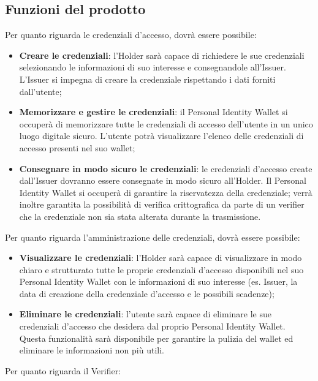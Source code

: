 \subsection{Funzioni del prodotto}
Per quanto riguarda le credenziali d’accesso, dovrà essere possibile: 
\begin{itemize}
    \item \textbf{Creare le credenziali}: l’Holder sarà capace di richiedere le sue credenziali selezionando le informazioni di suo interesse e consegnandole all’Issuer. L’Issuer si impegna di creare la credenziale rispettando i dati forniti dall’utente;
    \item \textbf{Memorizzare e gestire le credenziali}: il Personal Identity Wallet si occuperà di memorizzare tutte le credenziali di accesso dell’utente in un unico luogo digitale sicuro. L’utente potrà visualizzare l’elenco delle credenziali di accesso presenti nel suo wallet;
    \item \textbf{Consegnare in modo sicuro le credenziali}: le credenziali d’accesso create dall’Issuer dovranno essere consegnate in modo sicuro all’Holder. Il Personal Identity Wallet si occuperà di garantire la riservatezza della credenziale; verrà inoltre garantita la possibilità di verifica crittografica da parte di un verifier che la credenziale non sia stata alterata durante la trasmissione.
\end{itemize}
Per quanto riguarda l’amministrazione delle credenziali, dovrà essere possibile: 
\begin{itemize}
    \item \textbf{Visualizzare le credenziali}: l’Holder sarà capace di visualizzare in modo chiaro e strutturato tutte le proprie credenziali d’accesso disponibili nel suo Personal Identity Wallet con le informazioni di suo interesse (es. Issuer, la data di creazione della credenziale d’accesso e le possibili scadenze);
    \item \textbf{Eliminare le credenziali}: l’utente sarà capace di eliminare le sue credenziali d’accesso che desidera dal proprio Personal Identity Wallet. Questa funzionalità sarà disponibile per garantire la pulizia del wallet ed eliminare le informazioni non più utili.
\end{itemize}
Per quanto riguarda il Verifier: 
